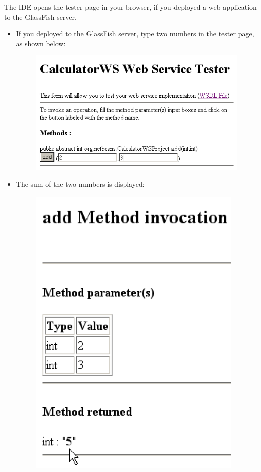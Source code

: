 The IDE opens the tester page in your browser, if you deployed a web application to the GlassFish server.
\begin{itemize}
\item If you deployed to the GlassFish server, type two numbers in the tester page, as shown below:

\begin{figure}
\begin{center}
\includegraphics[scale=1]{J9}
\label{J9}
\end{center}
\end{figure}

\item The sum of the two numbers is displayed:

\begin{figure}
\begin{center}
\includegraphics[scale=1]{J10}
\label{J10}
\end{center}
\end{figure}

\end{itemize}

